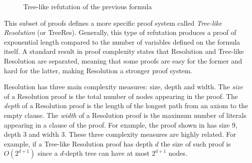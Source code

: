 \begin{figure}[H]
    \centering
    
    
    \caption{Tree-like refutation of the previous formula}
    \label{treelike_res_proof}
\end{figure}

This subset of proofs defines a more specific proof system called \textit{Tree-like Resolution} (or \textsf{TreeRes}). Generally, this type of refutation produces a proof of exponential length compared to the number of variables defined on the formula itself. A standard result in proof complexity states that Resolution and Tree-like Resolution are separated, meaning that some proofs are easy for the former and hard for the latter, making Resolution a stronger proof system.

\newpage

Resolution has three main complexity measures: size, depth and width. The \textit{size} of a Resolution proof is the total number of nodes appearing in the proof. The \textit{depth} of a Resolution proof is the length of the longest path from an axiom to the empty clause. The \textit{width} of a Resolution proof is the maximum number of literals appearing in a clause of the proof. For example, the proof shown in  has size 9, depth 3 and width 3. These three complexity measures are highly related. For example, if a Tree-like Resolution proof has depth $d$ the size of such proof is $O(2^{d+1})$ since a $d$-depth tree can have at most $2^{d+1}$ nodes.

